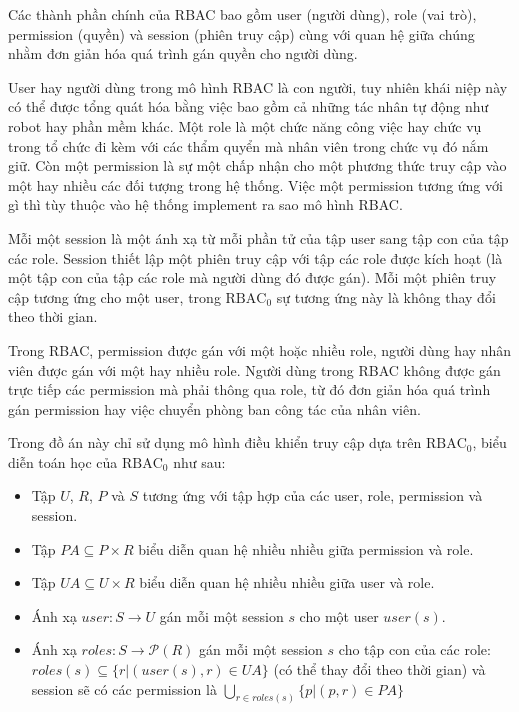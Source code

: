 Các thành phần chính của RBAC bao gồm user (người dùng),
role (vai trò), permission (quyền) và session (phiên truy cập)
cùng với quan hệ giữa chúng nhằm đơn giản hóa quá trình
gán quyền cho người dùng. 

User hay người dùng trong mô hình RBAC là con người, tuy nhiên
khái niệp này có thể được tổng quát hóa bằng việc bao gồm cả những
tác nhân tự động như robot hay phần mềm khác. Một role là một
chức năng công việc hay chức vụ trong tổ chức đi kèm với các
thẩm quyển mà nhân viên trong chức vụ đó nắm giữ. Còn một
permission là sự một chấp nhận cho một phương thức truy cập
vào một hay nhiều các đối tượng trong hệ thống. Việc một
permission tương ứng với gì thì tùy thuộc vào hệ thống
implement ra sao mô hình RBAC.

Mỗi một session là một ánh xạ từ mỗi phần tử của tập user
sang tập con của tập các role. Session thiết lập một phiên
truy cập với tập các role được kích hoạt (là một tập con
của tập các role mà người dùng đó được gán). Mỗi một phiên truy
cập tương ứng cho một user, trong $\text{RBAC}_0$ sự tương ứng này
là không thay đổi theo thời gian.

Trong RBAC, permission được gán với một hoặc nhiều role,
người dùng hay nhân viên được gán với một hay nhiều role.
Người dùng trong RBAC không được gán trực tiếp các permission mà
phải thông qua role, từ đó đơn giản hóa quá trình gán
permission hay việc chuyển phòng ban công tác của nhân viên. 

Trong đồ án này chỉ sử dụng mô hình điều khiển truy cập
dựa trên $\text{RBAC}_0$, biểu diễn toán học của $\text{RBAC}_0$ như sau:
\begin{itemize}[topsep=0ex]
\item Tập $U$, $R$, $P$ và $S$ tương ứng với tập hợp của các
    user, role, permission và session.
\item Tập $PA \subseteq P \times R$ biểu diễn quan hệ nhiều nhiều
    giữa permission và role.
\item Tập $UA \subseteq U \times R$ biểu diễn quan hệ nhiều nhiều giữa user và role.
\item Ánh xạ $user: S \rightarrow U$ gán mỗi một
    session $s$ cho một user $user(s)$.
\item Ánh xạ $roles: S \rightarrow \mathcal{P}(R)$ gán mỗi một
    session $s$ cho tập con của các role: 
    $roles(s) \subseteq \{ r | \left( user(s), r \right) \in UA \}$
    (có thể thay đổi theo thời gian) và session sẽ có các permission
    là $\bigcup_{r \in roles(s)}  \{ p | (p, r) \in PA \}$
\end{itemize}

